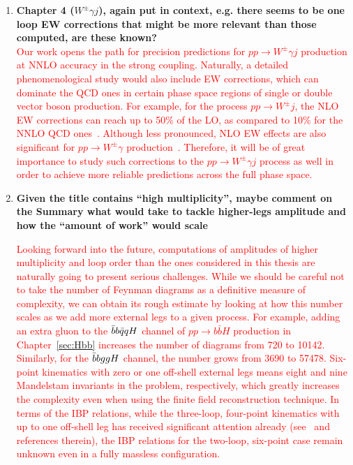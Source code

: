 \documentclass[main.tex]{subfiles}
\begin{document}
\begin{enumerate}
\item \textbf{Chapter 4 ($W^\pm \gamma j$), again put in context, e.g. there seems to be one loop EW corrections
that might be more relevant than those computed, are these known?}
\\
\textcolor{red}{Our work opens the path for precision predictions for $pp \rightarrow W^\pm \gamma j$ production at NNLO accuracy in the strong coupling. Naturally, a detailed phenomenological study would also include EW corrections, which can dominate the QCD ones in certain phase space regions of single or double vector boson production. For example, for the process $pp \rightarrow W^\pm j$, the NLO EW corrections can reach up to 50\% of the LO, as compared to 10\% for the NNLO QCD ones~\cite{Tricoli:2020uxr, Gehrmann-DeRidder:2017mvr, Boughezal:2015dva, Boughezal:2016dtm, Lindert:2017olm}. Although less pronounced, NLO EW effects are also significant for $pp \rightarrow W^\pm \gamma$ production~\cite{Cridge:2021hfr, Denner:2014bna, Accomando:2005ra, Grazzini:2015nwa, Campbell:2021mlr}. Therefore, it will be of great importance to study such corrections to the $pp \rightarrow W^\pm \gamma j$ process as well in order to achieve more reliable predictions across the full phase space.}

\item \textbf{Given the title contains “high multiplicity”, maybe comment on the Summary what
would take to tackle higher-legs amplitude and how the “amount of work” would
scale}

\textcolor{red}{Looking forward into the future, computations of amplitudes of higher multiplicity and loop order than the ones considered in this thesis are naturally going to present serious challenges. While we should be careful not to take the number of Feynman diagrams as a definitive measure of complexity, we can obtain its rough estimate by looking at how this number scales as we add more external legs to a given process. For example, adding an extra gluon to the $\bar{b}b\bar{q}qH$ channel of $pp\to b\bar{b}H$ production in Chapter~\ref{sec:Hbb} increases the number of diagrams from 720 to 10142. Similarly, for the $\bar{b}bggH$ channel, the number grows from 3690 to 57478. Six-point kinematics with zero or one off-shell external legs means eight and nine Mandelstam invariants in the problem, respectively, which greatly increases the complexity even when using the finite field reconstruction technique. In terms of the IBP relations, while the three-loop, four-point kinematics with up to one off-shell leg has received significant attention already (see~\cite{Canko:2023yoe} and references therein), the IBP relations for the two-loop, six-point case remain unknown even in a fully massless configuration.}


\end{enumerate}
\end{document}
